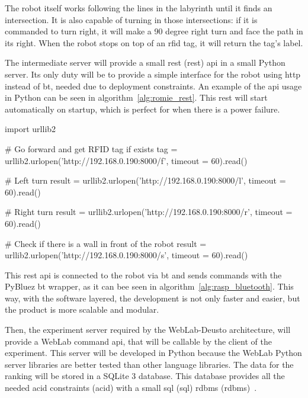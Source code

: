 The robot itself works following the lines in the labyrinth until it finds an intersection. It is
also capable of turning in those intersections: if it is commanded to turn right, it will make a 90
degree right turn and face the path in its right. When the robot stops on top of an \acrshort{rfid}
tag, it will return the tag's label.

The intermediate server will provide a small \acrlong{rest} (\acrshort{rest}) \acrshort{api} in a
small Python server. Its only duty will be to provide a simple interface for the robot using
\acrshort{http} instead of \acrlong{bt}, needed due to deployment constraints. An example of
the \acrshort{api} usage in Python can be seen in algorithm~\ref{alg:romie_rest}. This
\acrshort{rest} will start automatically on startup, which is perfect for when there is a power
failure.

\begin{center}
\begin{minipage}{.9\textwidth}
\singlespace
{}
\begin{pyglist}[language=python, caption={Romie \acrshort{rest} \acrshort{api} example.},
	label={alg:romie_rest}, listingname={Algorithm}, numbers=left]
import urllib2

# Go forward and get RFID tag if exists
tag = urllib2.urlopen('http://192.168.0.190:8000/f',
    timeout = 60).read()

# Left turn
result = urllib2.urlopen('http://192.168.0.190:8000/l',
    timeout = 60).read()

# Right turn
result = urllib2.urlopen('http://192.168.0.190:8000/r',
    timeout = 60).read()

# Check if there is a wall in front of the robot
result = urllib2.urlopen('http://192.168.0.190:8000/s',
    timeout = 60).read()
\end{pyglist}
\end{minipage}
\end{center}

This \acrshort{rest} \acrshort{api} is connected to the robot via \acrlong{bt} and sends commands
with the PyBluez \acrlong{bt} wrapper, as it can bee seen in algorithm~\ref{alg:rasp_bluetooth}.
This way, with the software layered, the development is not only faster and easier, but the product
is more scalable and modular.

Then, the experiment server required by the WebLab-Deusto architecture, will provide a WebLab
command \acrshort{api}, that will be callable by the client of the experiment. This server will be
developed in Python because the WebLab Python server libraries are better tested than other language
libraries. The data for the ranking will be stored in a SQLite 3 database. This database provides
all the needed \acrshort{acid} constraints (\acrlong{acid}) with a small \acrshort{sql}
(\acrlong{sql}) \acrlong{rdbms} (\acrshort{rdbms})~\cite{sqlite}.

